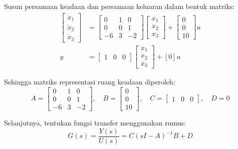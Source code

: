 \documentclass[11pt,a4paper]{article}
\begin{document}
Susun persamaan keadaan dan persamaan keluaran dalam bentuk matriks:
\begin{align*}
    \begin{bmatrix}
        \dot{x}_1 \\ \dot{x}_2 \\ \dot{x}_3
    \end{bmatrix}
    &=
    \begin{bmatrix}
        0 & 1 & 0 \\
        0 & 0 & 1 \\
        -6 & 3 & -2
    \end{bmatrix}
    \begin{bmatrix}
        x_1 \\ x_2 \\ x_3
    \end{bmatrix}
    +
    \begin{bmatrix}
        0 \\ 0 \\ 10
    \end{bmatrix}
    u \\[6pt]
    y &=
    \begin{bmatrix}
        1 & 0 & 0
    \end{bmatrix}
    \begin{bmatrix}
        x_1 \\ x_2 \\ x_3
    \end{bmatrix}
    +
    [0]u
\end{align*}

Sehingga matriks representasi ruang keadaan diperoleh:
\begin{equation*}
    A = \begin{bmatrix} 0 & 1 & 0 \\ 0 & 0 & 1 \\ -6 & 3 & -2 \end{bmatrix}, \quad
    B = \begin{bmatrix} 0 \\ 0 \\ 10 \end{bmatrix}, \quad
    C = \begin{bmatrix} 1 & 0 & 0 \end{bmatrix}, \quad
    D = 0
\end{equation*}

Selanjutnya, tentukan fungsi transfer menggunakan rumus:
\begin{equation*}
    G(s) = \frac{Y(s)}{U(s)} = C(sI - A)^{-1}B + D
\end{equation*}
\end{document}
